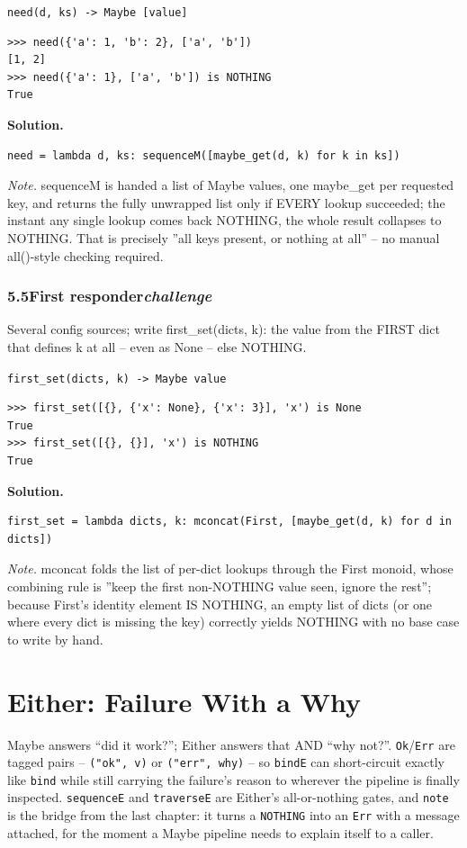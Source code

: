 \documentclass[10pt,letterpaper]{book}
\begin{document}
\noindent\texttt{need(d, ks) -> Maybe [value]}
\begin{lstlisting}[style=ex]
>>> need({'a': 1, 'b': 2}, ['a', 'b'])
[1, 2]
>>> need({'a': 1}, ['a', 'b']) is NOTHING
True
\end{lstlisting}
\noindent\textbf{Solution.}
\begin{lstlisting}[style=code]
need = lambda d, ks: sequenceM([maybe_get(d, k) for k in ks])
\end{lstlisting}
\noindent\textit{Note.} sequenceM is handed a list of Maybe values, one maybe\_get per requested key, and returns the fully unwrapped list only if EVERY lookup succeeded; the instant any single lookup comes back NOTHING, the whole result collapses to NOTHING. That is precisely ''all keys present, or nothing at all'' -- no manual all()-style checking required.

\subsection*{5.5\quad First responder\hfill\textnormal{\textit{challenge}}}
Several config sources; write first\_set(dicts, k): the value from the FIRST dict that defines k at all -- even as None -- else NOTHING.

\noindent\texttt{first\_set(dicts, k) -> Maybe value}
\begin{lstlisting}[style=ex]
>>> first_set([{}, {'x': None}, {'x': 3}], 'x') is None
True
>>> first_set([{}, {}], 'x') is NOTHING
True
\end{lstlisting}
\noindent\textbf{Solution.}
\begin{lstlisting}[style=code]
first_set = lambda dicts, k: mconcat(First, [maybe_get(d, k) for d in dicts])
\end{lstlisting}
\noindent\textit{Note.} mconcat folds the list of per-dict lookups through the First monoid, whose combining rule is ''keep the first non-NOTHING value seen, ignore the rest''; because First's identity element IS NOTHING, an empty list of dicts (or one where every dict is missing the key) correctly yields NOTHING with no base case to write by hand.

\clearpage
\chapter{Either: Failure With a Why}

Maybe answers ``did it work?''; Either answers that AND ``why not?''.
\texttt{Ok}/\texttt{Err} are tagged pairs -- \texttt{("ok", v)} or
\texttt{("err", why)} -- so \texttt{bindE} can short-circuit exactly like
\texttt{bind} while still carrying the failure's reason to wherever the
pipeline is finally inspected. \texttt{sequenceE} and \texttt{traverseE}
are Either's all-or-nothing gates, and \texttt{note} is the bridge from the
last chapter: it turns a \texttt{NOTHING} into an \texttt{Err} with a
message attached, for the moment a Maybe pipeline needs to explain itself
to a caller.
\end{document}
